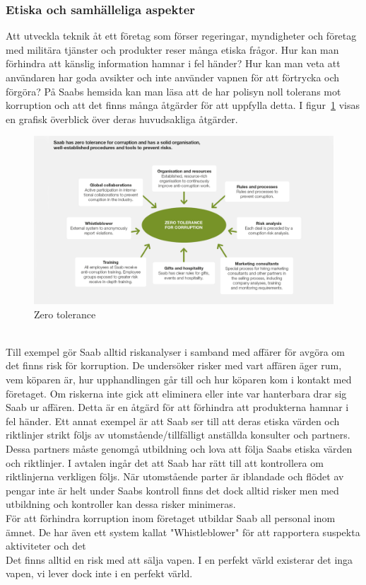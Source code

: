 \subsubsection{Etiska och samhälleliga aspekter}
Att utveckla teknik åt ett företag som förser regeringar, myndigheter och företag med militära tjänster och produkter reser många etiska frågor. Hur kan man förhindra att känslig information hamnar i fel händer? Hur kan man veta att användaren har goda avsikter och inte använder vapnen för att förtrycka och förgöra? På Saabs hemsida kan man läsa att de har polisyn noll tolerans mot korruption och att det finns många åtgärder för att uppfylla detta. I figur~\ref{fig:zerotolerance} visas en grafisk överblick över deras huvudsakliga åtgärder. 
\\
\leavevmode
\begin{figure}[h]
	\centering
	\includegraphics[scale=1.4]{grafik/modell_zero_corruption_1140x640.png}
	\caption{Zero tolerance}\label{fig:zerotolerance}	
\end{figure}  
\\
Till exempel gör Saab alltid riskanalyser i samband med affärer för avgöra om det finns risk för korruption. De undersöker risker med vart affären äger rum, vem köparen är, hur upphandlingen går till och hur köparen kom i kontakt med företaget. Om riskerna inte gick att eliminera eller inte var hanterbara drar sig Saab ur affären. Detta är en åtgärd för att förhindra att produkterna hamnar i fel händer. Ett annat exempel är att Saab ser till att deras etiska värden och riktlinjer strikt följs av utomstående/tillfälligt anställda konsulter och partners. Dessa partners måste genomgå utbildning och lova att följa Saabs etiska värden och riktlinjer. I avtalen ingår det att Saab har rätt till att kontrollera om riktlinjerna verkligen följs. När utomstående parter är iblandade och flödet av pengar inte är helt under Saabs kontroll finns det dock alltid risker men med utbildning och kontroller kan dessa risker minimeras.
\\ 
För att förhindra korruption inom företaget utbildar Saab all personal inom ämnet. De har även ett system kallat "Whistleblower" för att rapportera suspekta aktiviteter och det                  
\\
Det finns alltid en risk med att sälja vapen. I en perfekt värld existerar det inga vapen, vi lever dock inte i en perfekt värld.


